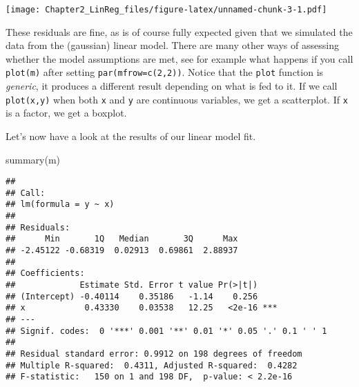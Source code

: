 \documentclass[
]{article}
\newenvironment{Shaded}{\begin{snugshade}}{\end{snugshade}}
\newcommand{\AttributeTok}[1]{\textcolor[rgb]{0.77,0.63,0.00}{#1}}
\newcommand{\DecValTok}[1]{\textcolor[rgb]{0.00,0.00,0.81}{#1}}
\newcommand{\FunctionTok}[1]{\textcolor[rgb]{0.00,0.00,0.00}{#1}}
\newcommand{\NormalTok}[1]{#1}
\newcommand{\OtherTok}[1]{\textcolor[rgb]{0.56,0.35,0.01}{#1}}
\newcommand{\SpecialCharTok}[1]{\textcolor[rgb]{0.00,0.00,0.00}{#1}}
\begin{document}
\begin{Shaded}
\end{Shaded}

\texttt{[image: Chapter2\_LinReg\_files/figure-latex/unnamed-chunk-3-1.pdf]}

These residuals are fine, as is of course fully expected given that we
simulated the data from the (gaussian) linear model. There are many
other ways of assessing whether the model assumptions are met, see for
example what happens if you call \texttt{plot(m)} after setting
\texttt{par(mfrow=c(2,2))}. Notice that the \texttt{plot} function is
\emph{generic}, it produces a different result depending on what is fed
to it. If we call \texttt{plot(x,y)} when both \texttt{x} and \texttt{y}
are continuous variables, we get a scatterplot. If \texttt{x} is a
factor, we get a boxplot.

Let's now have a look at the results of our linear model fit.

\begin{Shaded}
\begin{Highlighting}[]
\FunctionTok{summary}\NormalTok{(m)}
\end{Highlighting}
\end{Shaded}

\begin{verbatim}
## 
## Call:
## lm(formula = y ~ x)
## 
## Residuals:
##      Min       1Q   Median       3Q      Max 
## -2.45122 -0.68319  0.02913  0.69861  2.88937 
## 
## Coefficients:
##             Estimate Std. Error t value Pr(>|t|)    
## (Intercept) -0.40114    0.35186   -1.14    0.256    
## x            0.43330    0.03538   12.25   <2e-16 ***
## ---
## Signif. codes:  0 '***' 0.001 '**' 0.01 '*' 0.05 '.' 0.1 ' ' 1
## 
## Residual standard error: 0.9912 on 198 degrees of freedom
## Multiple R-squared:  0.4311, Adjusted R-squared:  0.4282 
## F-statistic:   150 on 1 and 198 DF,  p-value: < 2.2e-16
\end{verbatim}
\end{document}
